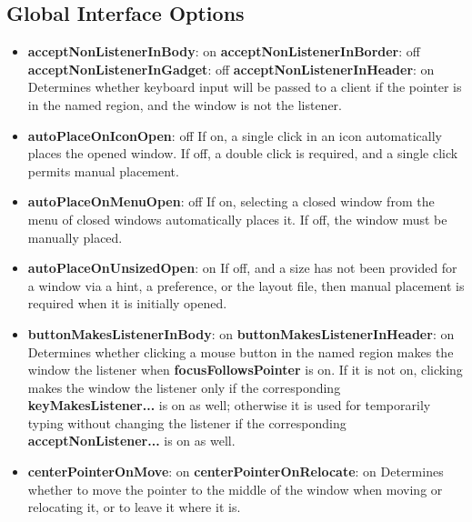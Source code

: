 \subsection{Global Interface Options}

\begin{itemize}
\item {\bf acceptNonListenerInBody}: on\newline{}
{\bf acceptNonListenerInBorder}: off\newline{}
{\bf acceptNonListenerInGadget}: off\newline{}
{\bf acceptNonListenerInHeader}: on\newline{}
Determines whether keyboard input will be passed to a client
if the pointer is in the named region, and the window is not
the listener.

\item {\bf autoPlaceOnIconOpen}: off\newline{}
If on, a single click in an icon automatically places the opened
window.  If off, a double click is required, and a single click
permits manual placement.

\item {\bf autoPlaceOnMenuOpen}: off\newline{}
If on, selecting a closed window from the menu of closed windows
automatically places it.  If off, the window must be manually
placed.

\item {\bf autoPlaceOnUnsizedOpen}: on\newline{}
If off, and a size has not been provided for a window via a hint, a
preference, or the layout file, then manual placement is required when it
is initially opened.

\item {\bf buttonMakesListenerInBody}: on\newline{}
{\bf buttonMakesListenerInHeader}: on\newline{}
Determines whether clicking a mouse button in the named region
makes the window the listener when {\bf focusFollowsPointer} is on.
If it is not on, clicking makes the window the listener only if the
corresponding {\bf keyMakesListener...} is on as well; otherwise it is used
for temporarily typing without changing the listener if the corresponding
{\bf acceptNonListener...} is on as well.

\item {\bf centerPointerOnMove}: on\newline{}
{\bf centerPointerOnRelocate}: on\newline{}
Determines whether to move the pointer to the middle of the window
when moving or relocating it, or to leave it where it is.


\end{itemize}
